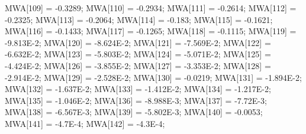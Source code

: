 \begin{code}
\begin{hide}
{      MWA[109] = -0.3289;
      MWA[110] = -0.2934;
      MWA[111] = -0.2614;
      MWA[112] = -0.2325;
      MWA[113] = -0.2064;
      MWA[114] = -0.183;
      MWA[115] = -0.1621;
      MWA[116] = -0.1433;
      MWA[117] = -0.1265;
      MWA[118] = -0.1115;
      MWA[119] = -9.813E-2;
      MWA[120] = -8.624E-2;
      MWA[121] = -7.569E-2;
      MWA[122] = -6.632E-2;
      MWA[123] = -5.803E-2;
      MWA[124] = -5.071E-2;
      MWA[125] = -4.424E-2;
      MWA[126] = -3.855E-2;
      MWA[127] = -3.353E-2;
      MWA[128] = -2.914E-2;
      MWA[129] = -2.528E-2;
      MWA[130] = -0.0219;
      MWA[131] = -1.894E-2;
      MWA[132] = -1.637E-2;
      MWA[133] = -1.412E-2;
      MWA[134] = -1.217E-2;
      MWA[135] = -1.046E-2;
      MWA[136] = -8.988E-3;
      MWA[137] = -7.72E-3;
      MWA[138] = -6.567E-3;
      MWA[139] = -5.802E-3;
      MWA[140] = -0.0053;
      MWA[141] = -4.7E-4;
      MWA[142] = -4.3E-4;

}
\end{hide}
\end{code}
